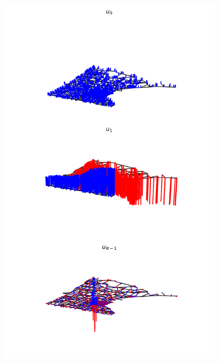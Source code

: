 \documentclass{beamer}
\begin{document}
\begin{frame}
\begin{columns}
\begin{column}{0.5\textwidth}
\begin{figure}
\includegraphics[trim={0 0 0 16cm},clip,width=\linewidth]{../img/graph_fourier_transform_5.pdf}
\end{figure}
  \end{column}
  \end{columns}
\end{frame}
\end{document}

